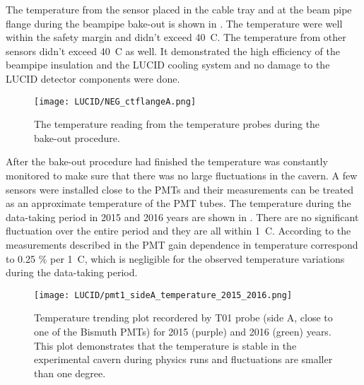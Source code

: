 The temperature from the sensor placed in the cable tray and at the beam pipe flange during the beampipe bake-out is shown in .
The temperature were well within the safety margin and didn't exceed 40\degree~C. The temperature from other sensors didn't exceed 40\degree~C as well.
It demonstrated the high efficiency of the beampipe insulation and the LUCID cooling system and no damage to the LUCID detector components were done.

\begin{figure}
\centering
\texttt{[image: LUCID/NEG\_ctflangeA.png]}
\caption{The temperature reading from the temperature probes during the bake-out procedure.}
\label{fig:NEG_ctflangeA}
\end{figure}
 
After the bake-out procedure had finished the temperature was constantly monitored to make sure that there was no large fluctuations in the cavern.
A few sensors were installed close to the PMTs and their measurements can be treated as an approximate temperature of the PMT tubes.
The temperature during the data-taking period in 2015 and 2016 years are shown in . 
There are no significant fluctuation over the entire period and they are all within 1\degree~C.
According to the measurements described in  the PMT gain dependence in temperature correspond
to 0.25 $\%$ per 1\degree~C, which is negligible for the observed temperature variations during the data-taking period.

\begin{figure}
\centering
\texttt{[image: LUCID/pmt1\_sideA\_temperature\_2015\_2016.png]}
\caption{Temperature trending plot recordered by T01 probe (side A, close to one of the Bismuth PMTs)
for 2015 (purple) and 2016 (green) years. This plot demonstrates that the temperature is stable in 
the experimental cavern during physics runs and fluctuations are smaller than one degree.}
\label{fig:tempTrendingPlot}
\end{figure}


